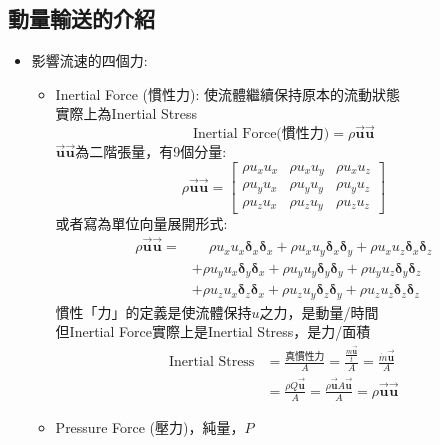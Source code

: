 \documentclass[../main.tex]{subfiles}
\begin{document}
\subsection{動量輸送的介紹}
\begin{itemize}
  \item 影響流速的四個力:
  \begin{itemize}
    \item Inertial Force (慣性力): 使流體繼續保持原本的流動狀態\\
    實際上為Inertial Stress
    \begin{equation}
      \text{Inertial Force(慣性力)} = \rho \vec {\bm u} \vec {\bm u}
    \end{equation}
    $\vec {\bm u} \vec {\bm u}$為二階張量，有9個分量:
    \begin{equation}
      \rho \vec {\bm u} \vec {\bm u} = \begin{bmatrix}
        \rho u_x u_x & \rho u_x u_y & \rho u_x u_z \\
        \rho u_y u_x & \rho u_y u_y & \rho u_y u_z \\
        \rho u_z u_x & \rho u_z u_y & \rho u_z u_z
      \end{bmatrix} \label{eq:inertial_stress_tensor}
    \end{equation}
    或者寫為單位向量展開形式:
    \begin{align}
      \rho \vec {\bm u} \vec {\bm u} =& \phantom{+}\rho u_x u_x \bm \delta_x \bm \delta_x + \rho u_x u_y \bm \delta_x \bm \delta_y + \rho u_x u_z \bm \delta_x \bm \delta_z \nonumber \\
      &+ \rho u_y u_x \bm \delta_y \bm \delta_x + \rho u_y u_y \bm \delta_y \bm \delta_y + \rho u_y u_z \bm \delta_y \bm \delta_z \nonumber \\
      &+ \rho u_z u_x \bm \delta_z \bm \delta_x + \rho u_z u_y \bm \delta_z \bm \delta_y + \rho u_z u_z \bm \delta_z \bm \delta_z
    \end{align}
    慣性「力」的定義是使流體保持$u$之力，是動量/時間\\
    但Inertial Force實際上是Inertial Stress，是力/面積
    \begin{align}
      \text{Inertial Stress} &= \frac{\text{真慣性力}}{A} = \frac{\frac{m\vec {\bm u}}{t}}{A} = \frac{\dot m\vec {\bm u}}{A} \nonumber \\
      &= \frac{\rho Q \vec {\bm u}}{A} = \frac{\rho \vec {\bm u} A \vec {\bm u}}{A} = \rho \vec {\bm u} \vec {\bm u}
    \end{align}
    \item Pressure Force (壓力)，純量，$P$

\end{itemize}
\end{itemize}
\end{document}
